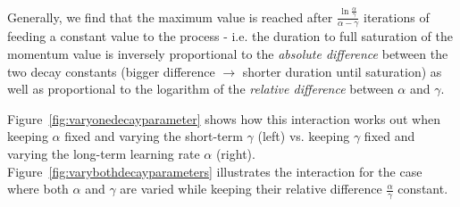 
Generally, we find that the maximum value is reached after $\frac{\ln\frac{\alpha}{\gamma}}{\alpha-\gamma}$ iterations of feeding a constant value to the process - i.e. the duration to full saturation of the momentum value is inversely proportional to the \emph{absolute difference} between the two decay constants (bigger difference $\rightarrow$ shorter duration until saturation) as well as proportional to the logarithm of the \emph{relative difference} between $\alpha$ and $\gamma$.

Figure~\ref{fig:varyonedecayparameter} shows how this interaction works out when keeping $\alpha$ fixed and varying the short-term $\gamma$ (left) vs. keeping $\gamma$ fixed and varying the long-term learning rate $\alpha$ (right). Figure~\ref{fig:varybothdecayparameters} illustrates the interaction for the case where both $\alpha$ and $\gamma$ are varied while keeping their relative difference $\frac{\alpha}{\gamma}$ constant.

